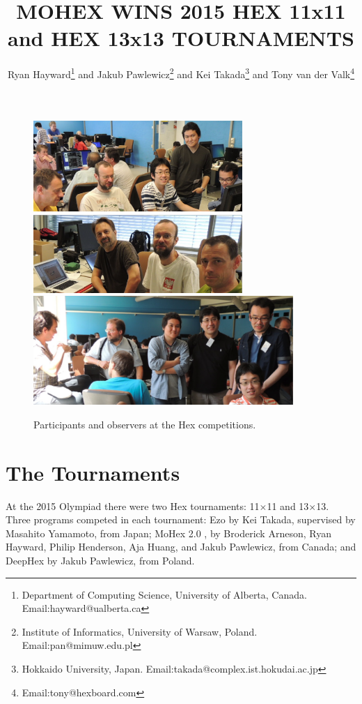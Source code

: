 \documentclass{icga}
\title{\sc MOHEX WINS 2015 HEX 11x11 and HEX 13x13 TOURNAMENTS}
\author{Ryan Hayward\thanks{Department 
of Computing Science, University of Alberta, Canada. Email:hayward@ualberta.ca} and
Jakub Pawlewicz\thanks{Institute of Informatics, University of Warsaw, Poland. Email:pan@mimuw.edu.pl} and
Kei Takada\thanks{Hokkaido University, Japan. Email:takada@complex.ist.hokudai.ac.jp} and
Tony van der Valk\thanks{Email:tony@hexboard.com}
}
\affiliation{Edmonton, Canada}
\def\Dx{\mbox{\sc DeepHex}}
\def\Eo{\mbox{\sc Ezo}}
\def\Mx{\mbox{\sc MoHex}}
\begin{document}
\maketitle

\vspace*{-2.25in}
\vspace*{2.0in}

\begin{figure}[hbt]
\includegraphics[width=225pt]{edo0.eps}\
\includegraphics[width=225pt]{rjt2.eps}\\

\hfill\includegraphics[width=280pt]{mas.eps}\hfill~
\caption{Participants and observers at the Hex competitions.}
\end{figure}


\section{The Tournaments}
At the 2015 Olympiad there were
two Hex tournaments: 11$\times$11 and 13$\times$13.
Three programs competed in each tournament:
\Eo{} 
by Kei Takada, supervised by Masahito Yamamoto, from Japan;
\Mx{} 2.0 , 
by Broderick Arneson, Ryan Hayward, Philip Henderson, Aja Huang, and Jakub Pawlewicz,
from Canada;
and
\Dx{}
by Jakub Pawlewicz, 
from Poland.
\end{document}
